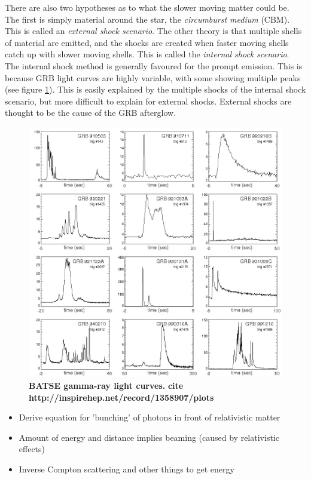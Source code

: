 \documentclass[11pt]{cuthesis}
\begin{document}
There are also two hypotheses as to what the slower moving matter could be. The first is simply material around the star, the \textit{circumburst medium} (CBM). This is called an \textit{external shock scenario}. The other theory is that multiple shells of material are emitted, and the shocks are created when faster moving shells catch up with slower moving shells. This is called the \textit{internal shock scenario}. The internal shock method is generally favoured for the prompt emission. This is because GRB light curves are highly variable, with some showing multiple peaks (see figure \ref{fig:grb lightcurves}). This is easily explained by the multiple shocks of the internal shock scenario, but more difficult to explain for external shocks. External shocks are thought to be the cause of the GRB afterglow.

\begin{figure} %
\begin{center}
\includegraphics[width=1.0\linewidth]{grb_lightcurves.png}
\end{center}
\caption{\textbf{BATSE gamma-ray light curves.}  \textbf{cite http://inspirehep.net/record/1358907/plots} }
\label{fig:grb lightcurves}
\end{figure}

\begin{itemize}
\item Derive equation for 'bunching' of photons in front of relativistic matter
\item Amount of energy and distance implies beaming (caused by relativistic effects)
\item Inverse Compton scattering and other things to get energy
\end{itemize}
\end{document}
